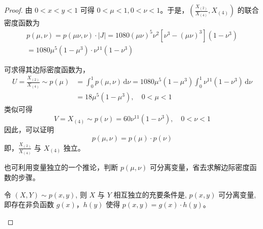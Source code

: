 \documentclass[normal,cn]{elegantnote}
\begin{document}
\begin{enumerate}
\begin{proof}
            由 $0<x<y<1$ 可得 $0<\mu<1,0<\nu<1$。于是，$\left(\frac{X_{(2)}}{X_{(4)}},X_{(4)}\right)$ 的联合密度函数为
            \begin{equation*}
                \begin{gathered}
                    p\left(\mu,\nu\right)=p\left(\mu\nu,\nu\right)\cdot|J|=1080\left(\mu\nu\right)^{5}\nu^{2}\left[\nu^{3}-\left(\mu\nu\right)^{3}\right]\left(1-\nu^{3}\right) \\
                    =1080\mu^{5}\left(1-\mu^{3}\right) \cdot \nu^{11}\left(1-\nu^{3}\right)
                \end{gathered}
            \end{equation*}

            可求得其边际密度函数为，
            \begin{equation*}
                \begin{aligned}
                    U=\frac{X_{(2)}}{X_{(4)}}\sim p(\mu) & =\int_{0}^{1}p(\mu,\nu)\,\mathrm{d}\nu=1080\mu^{5}\left(1-\mu^{3}\right)\int_{0}^{1}\nu^{11}\left(1-\nu^{3}\right)\,\mathrm{d}\nu \\
                                                         & =18\mu^{5}\left(1-\mu^{3}\right),\quad 0<\mu<1
                \end{aligned}
            \end{equation*}
            类似可得
            \begin{equation*}
                V=X_{(4)}\sim p(\nu)=60\nu^{11}\left(1-\nu^{3}\right),\quad 0<\nu<1
            \end{equation*}
            因此，可以证明
            \begin{equation*}
                p\left(\mu,\nu\right)=p(\mu) \cdot p(\nu)
            \end{equation*}
            即，$\frac{X_{(2)}}{X_{(4)}}$ 与 $X_{(4)}$ 独立。

            \begin{remark}
                也可利用变量独立的一个推论，判断 $p\left(\mu,\nu\right)$ 可分离变量，省去求解边际密度函数的步骤。
            \end{remark}

            \begin{corollary}
                令 $(X,Y)\sim p(x,y)$, 则 $X$ 与 $Y$ 相互独立的充要条件是, $p(x,y)$ 可分离变量, 即存在非负函数 $g(x)$，$h(y)$ 使得 $p(x,y)=g(x)\cdot h(y)$。
            \end{corollary}
        \end{proof}
\end{enumerate}
\end{document}
